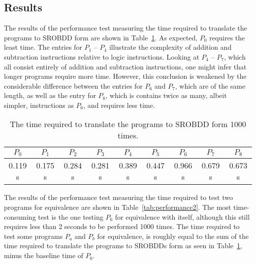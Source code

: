 \documentclass[a4paper,11pt]{kth-mag}
\begin{document}

\subsection{Results}

The results of the performance test measuring the time required to translate the programs to SROBDD form are shown in Table~\ref{tab:performance1}.
As expected, $P_0$ requires the least time.
The entries for $P_1$ -- $P_4$ illustrate the complexity of addition and subtraction instructions relative to logic instructions.
Looking at $P_4$ -- $P_7$, which all consist entirely of addition and subtraction instructions, one might infer that longer programs require more time.
However, this conclusion is weakened by the considerable difference between the entries for $P_6$ and $P_7$, which are of the same length,
as well as the entry for $P_8$, which is contains twice as many, albeit simpler, instructions as $P_6$, and requires less time.

\begin{table}
\centering
\begin{tabular}{*{9}{c}}
$P_0$   & $P_1$   & $P_2$   & $P_3$   & $P_4$   & $P_5$   & $P_6$   & $P_7$   & $P_8$   \\
\hline
0.119 s & 0.175 s & 0.284 s & 0.281 s & 0.389 s & 0.447 s & 0.966 s & 0.679 s & 0.673 s \\
\end{tabular}
\caption{The time required to translate the programs to SROBDD form 1000 times.}
\label{tab:performance1}
\end{table}

The results of the performance test measuring the time required to test two programs for equivalence are shown in Table~\ref{tab:performance2}.
The most time-consuming test is the one testing $P_6$ for equivalence with itself, although this still requires less than 2 seconds to be performed 1000 times.
The time required to test some programs $P_a$ and $P_b$ for equivalence, is roughly equal to the sum of the time required to translate the programs to SROBDDs form as seen in Table~\ref{tab:performance1}, minus the baseline time of $P_0$.
\end{document}

